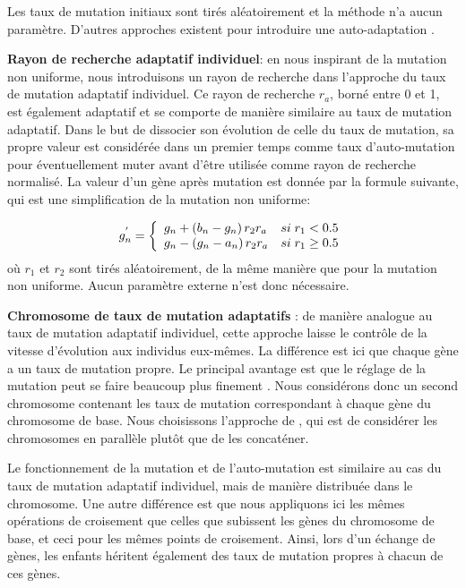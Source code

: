 \documentclass{ametsoc}
\begin{document}
	Les taux de mutation initiaux sont tirés aléatoirement \citep{Back1992} et la méthode n'a aucun paramètre. D'autres approches existent pour introduire une auto-adaptation \citep[voir p.ex.][]{Smith1997,Deb1999,Deb2001}.
	
	
	\item \textbf{Rayon de recherche adaptatif individuel}: en nous inspirant de la mutation non uniforme, nous introduisons un rayon de recherche dans l'approche du taux de mutation adaptatif individuel. Ce rayon de recherche $r_{a}$, borné entre 0 et 1, est également adaptatif et se comporte de manière similaire au taux de mutation adaptatif. Dans le but de dissocier son évolution de celle du taux de mutation, sa propre valeur est considérée dans un premier temps comme taux d'auto-mutation pour éventuellement muter avant d'être utilisée comme rayon de recherche normalisé. La valeur d'un gène après mutation est donnée par la formule suivante, qui est une simplification de la mutation non uniforme:
	
	\begin{equation}
	g_{n}^{'} = 
	\left\lbrace \begin{array}{l l} 
	g_{n} + \left(b_{n}-g_{n}\right) r_{2} r_{a} & si \; r_{1} < 0.5 \\
	g_{n} - \left(g_{n}-a_{n}\right) r_{2} r_{a} & si \; r_{1} \geq 0.5 \\
	\end{array} \right.
	\label{equation_mutation_rayon_adaptatif}
	\end{equation}
	\noindent
	où $r_{1}$ et $r_{2}$ sont tirés aléatoirement, de la même manière que pour la mutation non uniforme. Aucun paramètre externe n'est donc nécessaire.
	
	
	\item \textbf{Chromosome de taux de mutation adaptatifs} \citep[\textit{n adaptative mutation rate},][]{Back1992}: de manière analogue au taux de mutation adaptatif individuel, cette approche laisse le contrôle de la vitesse d'évolution aux individus eux-mêmes. La différence est ici que chaque gène a un taux de mutation propre. Le principal avantage est que le réglage de la mutation peut se faire beaucoup plus finement \citep{Smith1997}. Nous considérons donc un second chromosome contenant les taux de mutation correspondant à chaque gène du chromosome de base. Nous choisissons l'approche de \citet{Magnin2006}, qui est de considérer les chromosomes en parallèle plutôt que de les concaténer.
	
	Le fonctionnement de la mutation et de l'auto-mutation est similaire au cas du taux de mutation adaptatif individuel, mais de manière distribuée dans le chromosome. Une autre différence est que nous appliquons ici les mêmes opérations de croisement que celles que subissent les gènes du chromosome de base, et ceci pour les mêmes points de croisement. Ainsi, lors d'un échange de gènes, les enfants héritent également des taux de mutation propres à chacun de ces gènes.
	
\end{document}
